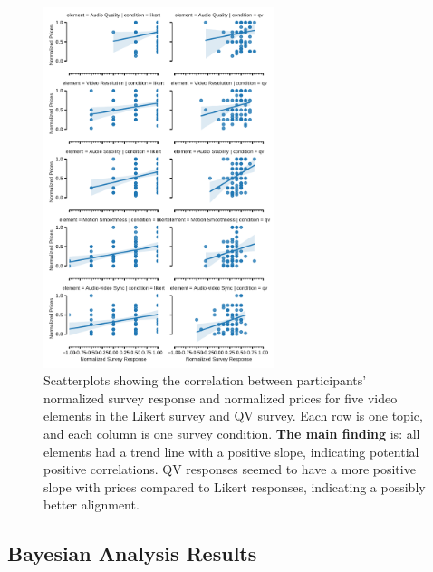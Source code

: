 \begin{figure}[htpb]
    \centering
    \includegraphics[width=0.6\textwidth, keepaspectratio=true]{content/image/correlation_per_element.pdf}
    \caption{
      Scatterplots showing the correlation between participants' normalized survey response and normalized prices for five video elements in the Likert survey and QV survey. Each row is one topic, and each column is one survey condition. \textbf{The main finding} is: all elements had a trend line with a positive slope, indicating potential positive correlations. QV responses seemed to have a more positive slope with prices compared to Likert responses, indicating a possibly better alignment.
    }
    \label{fig:topic_covariate_exp2}
\end{figure}


\subsection{Bayesian Analysis Results}


